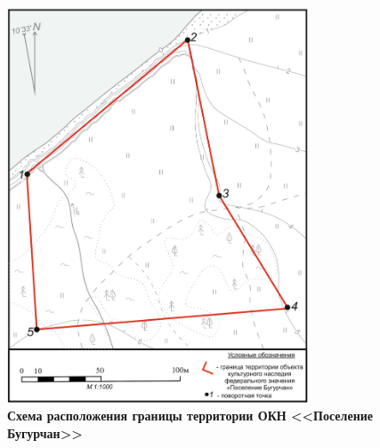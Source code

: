 \begin{figure}[h!]
  \begin{center}
    \includegraphics[width=0.8\textwidth]{authors/zelenskay.jpg}
  \end{center}
  \caption*{\textbf{Схема расположения границы территории ОКН <<Поселение Бугурчан>>}}
  \label{fig:zelenskay}
\end{figure}
